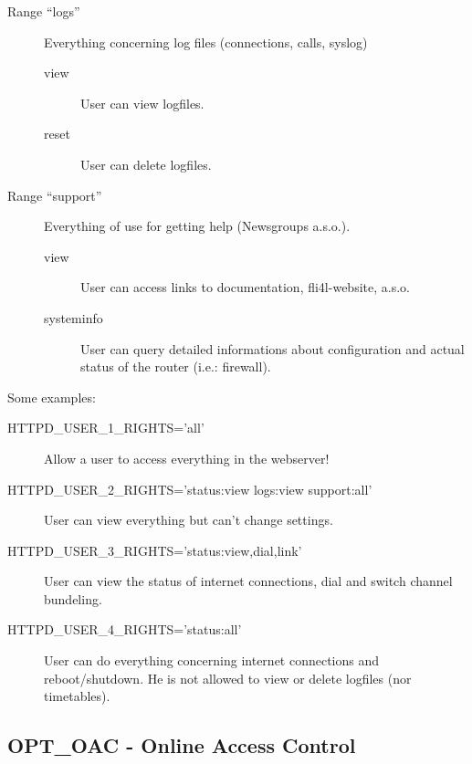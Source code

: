 \begin{description}
{\begin{description}
      \item[Range ``logs''] Everything concerning log files (connections, calls, syslog)
        \begin{description}
        \item[view] User can view logfiles.
        \item[reset] User can delete logfiles.
        \end{description}

      \item[Range ``support''] Everything of use for getting help (Newsgroups a.s.o.).
        \begin{description}
        \item[view] User can access links to documentation, fli4l-website, a.s.o.
        \item[systeminfo] User can query detailed informations about configuration 
	                  and actual status of the router (i.e.: firewall).
        \end{description}

      \end{description}

    Some examples:
        
      \begin{description}
      \item[HTTPD\_USER\_1\_RIGHTS='all']
        Allow a user to access everything in the webserver!

      \item[HTTPD\_USER\_2\_RIGHTS='status:view logs:view support:all']
        User can view everything but can't change settings.

      \item[HTTPD\_USER\_3\_RIGHTS='status:view,dial,link']
        User can view the status of internet connections, dial and switch channel bundeling.

      \item[HTTPD\_USER\_4\_RIGHTS='status:all']
        User can do everything concerning internet connections
        and reboot/shutdown. He is not allowed to view or delete 
	logfiles (nor timetables).
      \end{description}
    }

\end{description}

\subsection{OPT\_OAC - Online Access Control}

